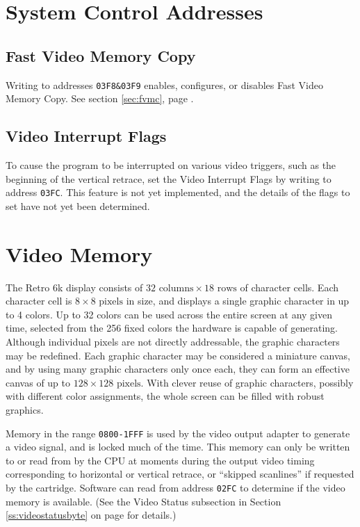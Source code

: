 \documentclass[12pt]{{memoir}}
\begin{document}
\section{System Control Addresses}
\label{sec:sysoutput}

\subsection{Fast Video Memory Copy}

Writing to addresses \texttt{03F8\&03F9} enables, configures, or disables Fast Video Memory Copy. See section \ref{sec:fvmc}, page \pageref{sec:fvmc}.

\subsection{Video Interrupt Flags}

To cause the program to be interrupted on various video triggers, such as the beginning of the vertical retrace, set the Video Interrupt Flags by writing to address \texttt{03FC}. This feature is not yet implemented, and the details of the flags to set have not yet been determined.

\section{Video Memory}
\label{sec:videomem}

The Retro 6k display consists of $32 \textrm{ columns} \times 18 \textrm{ rows}$ of character cells. Each character cell is $8 \times 8 \textrm{ pixels}$ in size, and displays a single graphic character in up to 4 colors. Up to 32 colors can be used across the entire screen at any given time, selected from the 256 fixed colors the hardware is capable of generating. Although individual pixels are not directly addressable, the graphic characters may be redefined. Each graphic character may be considered a miniature canvas, and by using many graphic characters only once each, they can form an effective canvas of up to $128 \times 128 \textrm{ pixels}$. With clever reuse of graphic characters, possibly with different color assignments, the whole screen can be filled with robust graphics.

Memory in the range \texttt{0800-1FFF} is used by the video output adapter to generate a video signal, and is locked much of the time. This memory can only be written to or read from by the CPU at moments during the output video timing corresponding to horizontal or vertical retrace, or ``skipped scanlines'' if requested by the cartridge. Software can read from address \texttt{02FC} to determine if the video memory is available. (See the Video Status subsection in Section \ref{ss:videostatusbyte} on page \pageref{ss:videostatusbyte} for details.)
\end{document}

